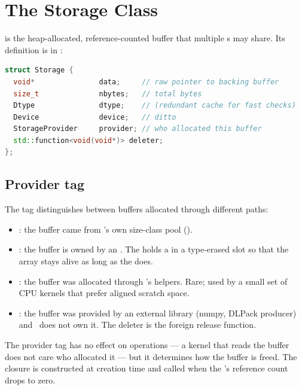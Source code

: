 \section{The Storage Class}
\label{sec:tensor_model:storage}

 is the heap-allocated, reference-counted buffer that
multiple s may share. Its definition is in
:

\begin{lstlisting}[style=lucidcpp,language=C++]
struct Storage {
  void*               data;     // raw pointer to backing buffer
  size_t              nbytes;   // total bytes
  Dtype               dtype;    // (redundant cache for fast checks)
  Device              device;   // ditto
  StorageProvider     provider; // who allocated this buffer
  std::function<void(void*)> deleter;
};
\end{lstlisting}

\subsection{Provider tag}
\label{ssec:tensor_model:provider}

The  tag distinguishes between buffers allocated
through different paths:

\begin{itemize}
  \item {}: the buffer came from \Lucid's own
    size-class pool ().
  \item {}: the buffer is owned by an .
    The  holds a  in a
    type-erased slot so that the array stays alive as long as the
     does.
  \item {}: the buffer was allocated through
    \Accelerate's  helpers. Rare; used by a
    small set of CPU kernels that prefer aligned scratch space.
  \item {}: the buffer was provided by an external
    library (numpy, DLPack producer) and \Lucid\ does not own it.
    The deleter is the foreign release function.
\end{itemize}

The provider tag has no effect on operations --- a kernel that
reads the buffer does not care who allocated it --- but it
determines how the buffer is freed. The  closure is
constructed at  creation time and called when the
's reference count drops to zero.

